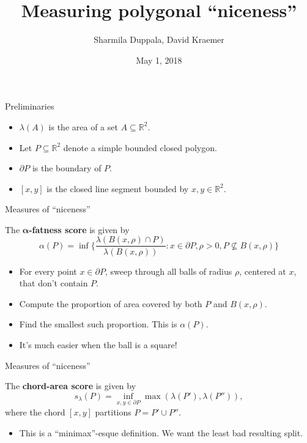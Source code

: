\documentclass[draft]{beamer}
\title{Measuring polygonal ``niceness''}
\author[Duppala, Kraemer]{%
Sharmila Duppala\inst{1}, %
David Kraemer\inst{1}}
\institute[Stony Brook University]
{
  \inst{1}%
  AMS 545: Computational Geometry \\
  Stony Brook University
}
\date[2018]{May 1, 2018}
\newcommand{\RR}{\mathbb{R}}
\newcommand{\set}[1]{\{ #1 \}}
\newcommand{\defkey}{\textbf}
\begin{document}
\frame{\titlepage}

\begin{frame}[t]{Preliminaries}
  \begin{itemize}
    \item $\lambda(A)$ is the area of a set $A \subseteq \RR^2$.
    \item Let $P \subseteq \RR^2$ denote a simple bounded closed polygon.
    \item $\partial P$ is the boundary of $P$.
    \item $[x,y]$ is the closed line segment bounded by $x,y \in \RR^2$.
  \end{itemize}
\end{frame}

\begin{frame}[t]{Measures of ``niceness''}
  \begin{definition}
    The \defkey{$\bm{\alpha}$-fatness score} is given by
    \begin{equation*}
      \alpha(P) = \inf\set{
        \frac{\lambda(B(x, \rho) \cap P)}{\lambda(B(x, \rho))} :
        x \in \partial P, \rho > 0, P \not\subseteq B(x, \rho)
      }
    \end{equation*}
  \end{definition}
  \begin{itemize}
    \item For every point $x \in \partial P$, sweep through all balls of radius
      $\rho$, centered at $x$, that don't contain $P$.
    \item Compute the proportion of area covered by both $P$ and $B(x,\rho)$.
    \item Find the smallest such proportion. This is $\alpha(P)$.
    \item It's much easier when the ball is a square!
  \end{itemize}
\end{frame}

\begin{frame}[t]{Measures of ``niceness''}
  \begin{definition}
    The \defkey{chord-area score} is given by
    \begin{equation*}
      s_\lambda(P) =
      \inf_{x,y \in \partial P} \max( \lambda(P'), \lambda(P'')),
    \end{equation*}
    where the chord $[x,y]$ partitions $P = P' \cup P''$.
  \end{definition}
  \begin{itemize}
    \item This is a ``minimax''-esque definition. We want the least bad resulting split.
  \end{itemize}
\end{frame}
\end{document}
